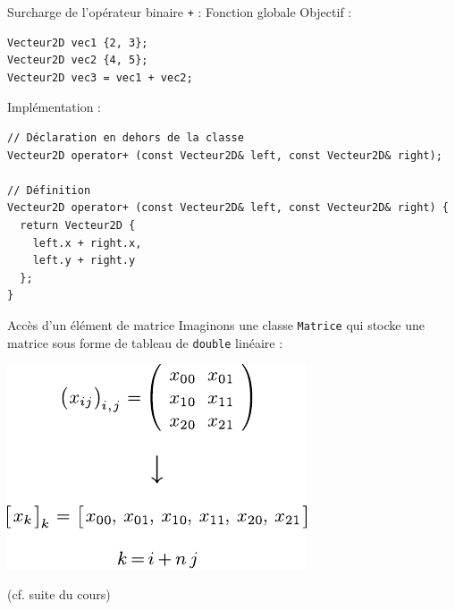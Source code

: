 \documentclass[c]{beamer}
\newcommand{\inline}[1]{\texttt{#1}}
\begin{document}
\begin{frame}[fragile]{Surcharge de l'opérateur binaire \texttt{+} : Fonction globale}
Objectif :
\begin{verbatim}
Vecteur2D vec1 {2, 3};
Vecteur2D vec2 {4, 5};
Vecteur2D vec3 = vec1 + vec2;
\end{verbatim}
\vspace{1em}
Implémentation :
\begin{verbatim}
// Déclaration en dehors de la classe
Vecteur2D operator+ (const Vecteur2D& left, const Vecteur2D& right);

// Définition
Vecteur2D operator+ (const Vecteur2D& left, const Vecteur2D& right) {
  return Vecteur2D {
    left.x + right.x,
    left.y + right.y
  };
}
\end{verbatim}
\end{frame}


\begin{frame}[fragile]{Accès d'un élément de matrice}
Imaginons une classe \inline{Matrice} qui stocke une matrice sous forme de tableau de \inline{double} linéaire :
\vspace{1em}
\begin{center}
\includegraphics[width=0.4\paperwidth]{matrix-linear-storage.pdf}
\end{center}
\vspace{1em}
(cf. suite du cours) 
\end{frame}
\end{document}
